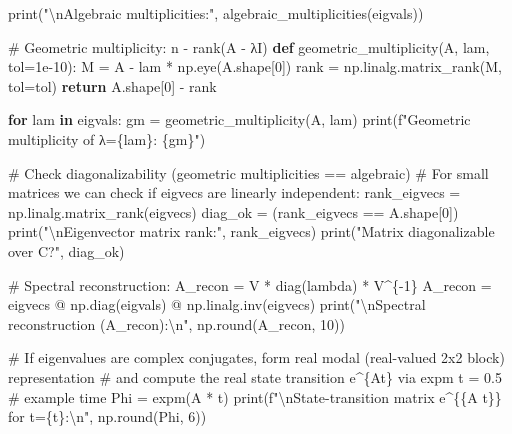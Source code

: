 \documentclass[
  letterpaper,
  DIV=11,
  numbers=noendperiod]{scrreprt}
\newenvironment{Shaded}{\begin{snugshade}}{\end{snugshade}}
\newcommand{\BuiltInTok}[1]{\textcolor[rgb]{0.00,0.23,0.31}{#1}}
\newcommand{\CharTok}[1]{\textcolor[rgb]{0.13,0.47,0.30}{#1}}
\newcommand{\CommentTok}[1]{\textcolor[rgb]{0.37,0.37,0.37}{#1}}
\newcommand{\ControlFlowTok}[1]{\textcolor[rgb]{0.00,0.23,0.31}{\textbf{#1}}}
\newcommand{\DecValTok}[1]{\textcolor[rgb]{0.68,0.00,0.00}{#1}}
\newcommand{\FloatTok}[1]{\textcolor[rgb]{0.68,0.00,0.00}{#1}}
\newcommand{\KeywordTok}[1]{\textcolor[rgb]{0.00,0.23,0.31}{\textbf{#1}}}
\newcommand{\NormalTok}[1]{\textcolor[rgb]{0.00,0.23,0.31}{#1}}
\newcommand{\OperatorTok}[1]{\textcolor[rgb]{0.37,0.37,0.37}{#1}}
\newcommand{\SpecialCharTok}[1]{\textcolor[rgb]{0.37,0.37,0.37}{#1}}
\newcommand{\SpecialStringTok}[1]{\textcolor[rgb]{0.13,0.47,0.30}{#1}}
\newcommand{\StringTok}[1]{\textcolor[rgb]{0.13,0.47,0.30}{#1}}
\begin{document}
\begin{Shaded}
\begin{Highlighting}[]
\BuiltInTok{print}\NormalTok{(}\StringTok{"}\CharTok{\textbackslash{}n}\StringTok{Algebraic multiplicities:"}\NormalTok{, algebraic\_multiplicities(eigvals))}

\CommentTok{\# Geometric multiplicity: n {-} rank(A {-} λI)}
\KeywordTok{def}\NormalTok{ geometric\_multiplicity(A, lam, tol}\OperatorTok{=}\FloatTok{1e{-}10}\NormalTok{):}
\NormalTok{    M }\OperatorTok{=}\NormalTok{ A }\OperatorTok{{-}}\NormalTok{ lam }\OperatorTok{*}\NormalTok{ np.eye(A.shape[}\DecValTok{0}\NormalTok{])}
\NormalTok{    rank }\OperatorTok{=}\NormalTok{ np.linalg.matrix\_rank(M, tol}\OperatorTok{=}\NormalTok{tol)}
    \ControlFlowTok{return}\NormalTok{ A.shape[}\DecValTok{0}\NormalTok{] }\OperatorTok{{-}}\NormalTok{ rank}

\ControlFlowTok{for}\NormalTok{ lam }\KeywordTok{in}\NormalTok{ eigvals:}
\NormalTok{    gm }\OperatorTok{=}\NormalTok{ geometric\_multiplicity(A, lam)}
    \BuiltInTok{print}\NormalTok{(}\SpecialStringTok{f"Geometric multiplicity of λ=}\SpecialCharTok{\{}\NormalTok{lam}\SpecialCharTok{\}}\SpecialStringTok{: }\SpecialCharTok{\{}\NormalTok{gm}\SpecialCharTok{\}}\SpecialStringTok{"}\NormalTok{)}

\CommentTok{\# Check diagonalizability (geometric multiplicities == algebraic)}
\CommentTok{\# For small matrices we can check if eigvecs are linearly independent:}
\NormalTok{rank\_eigvecs }\OperatorTok{=}\NormalTok{ np.linalg.matrix\_rank(eigvecs)}
\NormalTok{diag\_ok }\OperatorTok{=}\NormalTok{ (rank\_eigvecs }\OperatorTok{==}\NormalTok{ A.shape[}\DecValTok{0}\NormalTok{])}
\BuiltInTok{print}\NormalTok{(}\StringTok{"}\CharTok{\textbackslash{}n}\StringTok{Eigenvector matrix rank:"}\NormalTok{, rank\_eigvecs)}
\BuiltInTok{print}\NormalTok{(}\StringTok{"Matrix diagonalizable over C?"}\NormalTok{, diag\_ok)}

\CommentTok{\# Spectral reconstruction: A\_recon = V * diag(lambda) * V\^{}\{{-}1\}}
\NormalTok{A\_recon }\OperatorTok{=}\NormalTok{ eigvecs }\OperatorTok{@}\NormalTok{ np.diag(eigvals) }\OperatorTok{@}\NormalTok{ np.linalg.inv(eigvecs)}
\BuiltInTok{print}\NormalTok{(}\StringTok{"}\CharTok{\textbackslash{}n}\StringTok{Spectral reconstruction (A\_recon):}\CharTok{\textbackslash{}n}\StringTok{"}\NormalTok{, np.}\BuiltInTok{round}\NormalTok{(A\_recon, }\DecValTok{10}\NormalTok{))}

\CommentTok{\# If eigenvalues are complex conjugates, form real modal (real{-}valued 2x2 block) representation}
\CommentTok{\# and compute the real state transition e\^{}\{At\} via expm}
\NormalTok{t }\OperatorTok{=} \FloatTok{0.5}  \CommentTok{\# example time}
\NormalTok{Phi }\OperatorTok{=}\NormalTok{ expm(A }\OperatorTok{*}\NormalTok{ t)}
\BuiltInTok{print}\NormalTok{(}\SpecialStringTok{f"}\CharTok{\textbackslash{}n}\SpecialStringTok{State{-}transition matrix e\^{}}\CharTok{\{\{}\SpecialStringTok{A t}\CharTok{\}\}}\SpecialStringTok{ for t=}\SpecialCharTok{\{}\NormalTok{t}\SpecialCharTok{\}}\SpecialStringTok{:}\CharTok{\textbackslash{}n}\SpecialStringTok{"}\NormalTok{, np.}\BuiltInTok{round}\NormalTok{(Phi, }\DecValTok{6}\NormalTok{))}


\end{Highlighting}
\end{Shaded}
\end{document}
